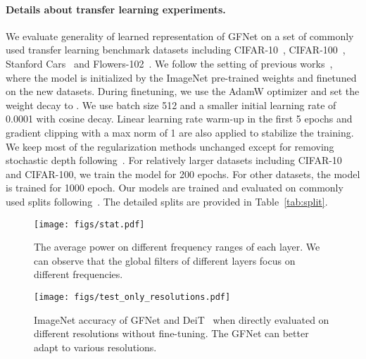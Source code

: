 \documentclass{article}
\numberwithin{equation}{section}
\newcommand{\gknet}{GFNet}
\begin{document}
\paragraph{Details about transfer learning experiments.}  We evaluate  generality of learned representation of GFNet on a set of commonly used transfer learning benchmark datasets including CIFAR-10~\cite{cifar}, CIFAR-100~\cite{cifar}, Stanford Cars~\cite{cars} and Flowers-102~\cite{flower}. We follow the setting of previous works~\cite{tan2019efficientnet,dosovitskiy2020vit,touvron2020deit,touvron2021resmlp}, where the model is initialized by the ImageNet pre-trained weights and finetuned on the new datasets. During finetuning, we use the AdamW optimizer and set the weight decay to . We use batch size 512 and a smaller initial learning rate of 0.0001 with cosine decay. Linear learning rate warm-up in the first 5 epochs and gradient clipping with a max norm of 1 are also applied to stabilize the training. We keep most of the regularization methods unchanged except for removing stochastic depth following~\cite{touvron2020deit}. For relatively larger datasets including CIFAR-10 and CIFAR-100, we train the model for 200 epochs. For other datasets, the model is trained for 1000 epoch. Our models are trained and evaluated on commonly used splits following~\cite{tan2019efficientnet}. The detailed splits are provided in Table~\ref{tab:split}.




\begin{figure}
\begin{minipage}{.48\textwidth}
     \centering
    \texttt{[image: figs/stat.pdf]}
    \caption{The average power on different frequency ranges of each layer. We can observe that the global filters of different layers focus on different frequencies.}
    \label{fig:stat} 
\end{minipage}\hfill
\begin{minipage}{0.48\textwidth}
     \centering
    \texttt{[image: figs/test\_only\_resolutions.pdf]}
    \caption{ImageNet accuracy of \gknet{} and DeiT~\cite{touvron2020deit} when directly evaluated on different resolutions without fine-tuning. The GFNet can better adapt to various resolutions.}
    \label{fig:test_res} 
\end{minipage}
\end{figure}
\end{document}
